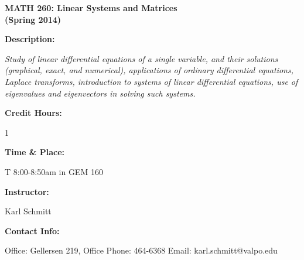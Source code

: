 \documentclass{article}
\theoremstyle{plain}
\theoremstyle{definition}
\theoremstyle{remark}
\begin{document}
\pagestyle{empty}


\begin{center}
\textbf{MATH 260: Linear Systems and Matrices \\(Spring 2014)}
\end{center}
\vspace{.5cm}
\vskip0.1in\noindent
\begin{minipage}[t]{1.2in}
	\textbf{Description: }
\end{minipage}
\begin{minipage}[t]{5.3in}
	\emph{Study of linear differential equations of a single variable, and their solutions (graphical, exact, and numerical), applications of ordinary differential equations, Laplace transforms, introduction to systems of linear differential equations, use of eigenvalues and eigenvectors in solving such systems. }
\end{minipage}

\vskip0.1in \noindent
\begin{minipage}[t]{1.2in}
	\textbf{Credit Hours:}
\end{minipage}
\begin{minipage}[t]{5.3in}
	1
\end{minipage}

\vskip0.1in\noindent
\begin{minipage}[t]{1.2in}
	\textbf{Time \& Place:}
\end{minipage}
\begin{minipage}[t]{5.3in}
 T 8:00-8:50am in GEM 160
\end{minipage}



\vskip0.1in \noindent
\begin{minipage}[t]{1.2in}
	\textbf{Instructor:}
\end{minipage}
\begin{minipage}[t]{5.3in}
	Karl Schmitt
\end{minipage}

\vskip0.1in \noindent
\begin{minipage}[t]{1.2in}
	\textbf{Contact Info:}
\end{minipage}
\begin{minipage}[t]{5.3in}
	Office: Gellersen 219, Office Phone: 464-6368
	\newline Email: karl.schmitt@valpo.edu
\end{minipage}
\end{document}
